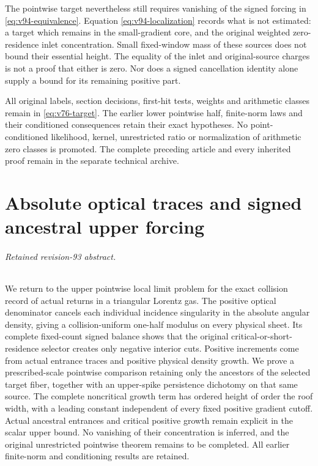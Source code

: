 \documentclass[11pt,reqno]{amsart}
\numberwithin{equation}{section}
\theoremstyle{definition}\newtheorem{definition}[theorem]{Definition}
\theoremstyle{remark}\newtheorem{remark}[theorem]{Remark}
\theoremstyle{definition}\newtheorem{inputstatement}[theorem]{Input statement}
\begin{document}
The pointwise target nevertheless still requires vanishing of the
signed forcing in \eqref{eq:v94-equivalence}. Equation
\eqref{eq:v94-localization} records what is not estimated: a target
which remains in the small-gradient core, and the original weighted
zero-residence inlet concentration. Small fixed-window mass of these
sources does not bound their essential height. The equality of the
inlet and original-source charges is not a proof that either is zero.
Nor does a signed cancellation identity alone supply a bound for its
remaining positive part.

All original labels, section decisions, first-hit tests, weights and
arithmetic classes remain in \eqref{eq:v76-target}. The earlier lower
pointwise half, finite-norm laws and their conditioned consequences
retain their exact hypotheses. No point-conditioned likelihood, kernel,
unrestricted ratio or normalization of arithmetic zero classes is
promoted. The complete preceding article and every inherited proof
remain in the separate technical archive.

\appendix


\endgroup
\part{Absolute optical traces and signed ancestral upper forcing}
\begingroup
\let\ArchiveLabel\label
\let\ArchiveRef\ref
\renewcommand{\label}[1]{\ArchiveLabel{v93archive:#1}}
\renewcommand{\ref}[1]{%
  \IfBeginWith{#1}{supp-}{%
    \StrBehind{#1}{supp-}[\ArchiveTarget]%
    \ArchiveRef{\ArchiveTarget}%
  }{\ArchiveRef{v93archive:#1}}%
}
\makeatletter
\let\ltx@label\label
\makeatother
\paragraph{Retained revision-93 abstract.}

We return to the upper pointwise local limit problem for the exact
collision record of actual returns in a triangular Lorentz gas.
The positive optical denominator cancels each individual incidence
singularity in the absolute angular density, giving a collision-uniform
one-half modulus on every physical sheet. Its complete fixed-count
signed balance shows that the original critical-or-short-residence
selector creates only negative interior cuts. Positive increments come
from actual entrance traces and positive physical density growth.
We prove a prescribed-scale pointwise comparison retaining only the
ancestors of the selected target fiber, together with an upper-spike
persistence dichotomy on that same source. The complete noncritical
growth term has ordered height of order the roof width, with a leading
constant independent of every fixed positive gradient cutoff. Actual
ancestral entrances and critical positive growth remain explicit in
the scalar upper bound. No vanishing of their concentration is inferred,
and the original unrestricted pointwise theorem remains to be completed.
All earlier finite-norm and conditioning results are retained.
\end{document}
